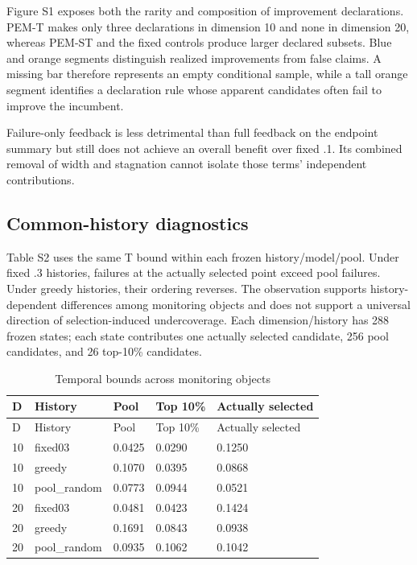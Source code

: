 \documentclass[cmc,article,submit,moreauthors,pdftex]{Definitions/tsp}
\begin{document}
Figure S1 exposes both the rarity and composition of improvement declarations. PEM-T makes only three declarations in dimension 10 and none in dimension 20, whereas PEM-ST and the fixed controls produce larger declared subsets. Blue and orange segments distinguish realized improvements from false claims. A missing bar therefore represents an empty conditional sample, while a tall orange segment identifies a declaration rule whose apparent candidates often fail to improve the incumbent.

Failure-only feedback is less detrimental than full feedback on the endpoint summary but still does not achieve an overall benefit over fixed .1. Its combined removal of width and stagnation cannot isolate those terms' independent contributions.

\hypertarget{common-history-diagnostics}{%
\subsection{Common-history diagnostics}\label{common-history-diagnostics}}

Table S2 uses the same T bound within each frozen history/model/pool. Under fixed .3 histories, failures at the actually selected point exceed pool failures. Under greedy histories, their ordering reverses. The observation supports history-dependent differences among monitoring objects and does not support a universal direction of selection-induced undercoverage. Each dimension/history has 288 frozen states; each state contributes one actually selected candidate, 256 pool candidates, and 26 top-10\% candidates.

\begin{longtable}[]{@{}lllll@{}}
\caption{Temporal bounds across monitoring objects}\tabularnewline
\toprule
D & History & Pool & Top 10\% & Actually selected \\
\midrule
\endfirsthead
\toprule
D & History & Pool & Top 10\% & Actually selected \\
\midrule
\endhead
10 & fixed03 & 0.0425 & 0.0290 & 0.1250 \\
10 & greedy & 0.1070 & 0.0395 & 0.0868 \\
10 & pool\_random & 0.0773 & 0.0944 & 0.0521 \\
20 & fixed03 & 0.0481 & 0.0423 & 0.1424 \\
20 & greedy & 0.1691 & 0.0843 & 0.0938 \\
20 & pool\_random & 0.0935 & 0.1062 & 0.1042 \\
\bottomrule
\end{longtable}
\end{document}
